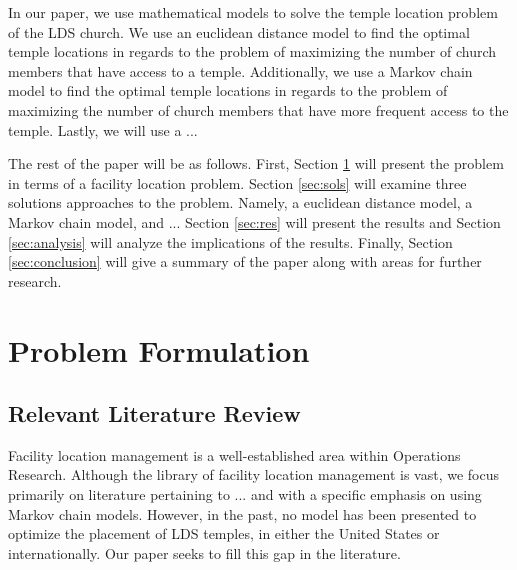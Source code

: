 \documentclass[twoside,twocolumn]{article}
\begin{document}
In our paper, we use mathematical models to solve the temple location problem of the LDS church. 
We use an euclidean distance model to find the optimal temple locations in regards to the problem of maximizing the number of church members that have access to a temple. 
Additionally, we use a Markov chain model to find the optimal temple locations in regards to the problem of maximizing the number of church members that have more frequent access to the temple. 
Lastly, we will use a ... %

The rest of the paper will be as follows.
First, Section \ref{sec:prob} will present the problem in terms of a facility location problem.
Section \ref{sec:sols} will examine three solutions approaches to the problem.
Namely, a euclidean distance model, a Markov chain model, and ... %
Section \ref{sec:res} will present the results and Section \ref{sec:analysis} will analyze the implications of the results.
Finally, Section \ref{sec:conclusion} will give a summary of the paper along with areas for further research.

\section{Problem Formulation}
\label{sec:prob}
\subsection{Relevant Literature Review}
Facility location management is a well-established area within Operations Research. Although the library of facility location management is vast, we focus primarily on literature pertaining to ... and with a specific emphasis on using Markov chain models. However, in the past, no model has been presented to optimize the placement of LDS temples, in either the United States or internationally. Our paper seeks to fill this gap in the literature.
\end{document}
